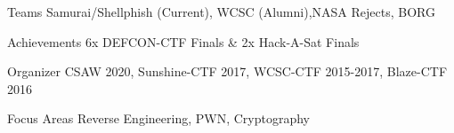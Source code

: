 
\begin{cvskills}
  \cvskill
    {Teams}
    {Samurai/Shellphish (Current), WCSC (Alumni),NASA Rejects, BORG}


  \cvskill
    {Achievements}
    {6x DEFCON-CTF Finals \& 2x Hack-A-Sat Finals}


  \cvskill
    {Organizer}
    {CSAW 2020, Sunshine-CTF 2017, WCSC-CTF 2015-2017, Blaze-CTF 2016}


  \cvskill
    {Focus Areas}
    {Reverse Engineering, PWN, Cryptography}

\end{cvskills}
